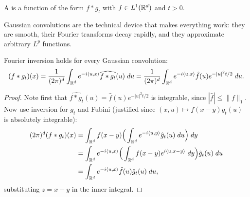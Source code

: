 \documentclass[a4paper]{scrartcl}
\newcommand{\ip}[2]{\langle #1, #2 \rangle}
\begin{document}
\begin{center}
\end{center}

\begin{definition}
	A  is a function of the form $f * g_t$ with $f \in L^1(\mathbb{R}^d)$ and $t>0$.
\end{definition}

Gaussian convolutions are the technical device that makes everything work: they are smooth, their Fourier transforms decay rapidly, and they approximate arbitrary $L^p$ functions.

\begin{lemma}\label{lem:gauss-conv-inv}
	Fourier inversion holds for every Gaussian convolution:
	$$
	(f*g_t)(x) = \frac{1}{(2\pi)^d}\int_{\R^d}e^{-i\ip{u}{x}}\widehat{f*g_t}(u)\dd u = \frac{1}{(2\pi)^d}\int_{\R^d}e^{-i\ip{u}{x}}\hat f(u)e^{-|u|^2t/2}\dd u.
	$$
\end{lemma}
\begin{proof}
	Note first that $\widehat{f*g_t}(u)=\hat f(u)e^{-|u|^2t/2}$ is integrable, since $|\hat f|\leq\|f\|_1$. Now use inversion for $g_t$ and Fubini (justified since $(x,u)\mapsto f(x-y)\hat g_t(u)$ is absolutely integrable):
	\begin{align*}
		(2\pi)^d (f*g_t)(x) &= \int_{\R^d}f(x-y)\Big(\int_{\R^d}e^{-i\ip{u}{y}}\hat g_t(u)\dd u\Big)\dd y\\
		&= \int_{\R^d}e^{-i\ip{u}{x}}\Big(\int_{\R^d}f(x-y)e^{i\ip{u}{x-y}}\dd y\Big)\hat g_t(u)\dd u\\
		&= \int_{\R^d}e^{-i\ip{u}{x}}\hat f(u)\hat g_t(u)\dd u,
	\end{align*}
	substituting $z=x-y$ in the inner integral.
\end{proof}
\end{document}
